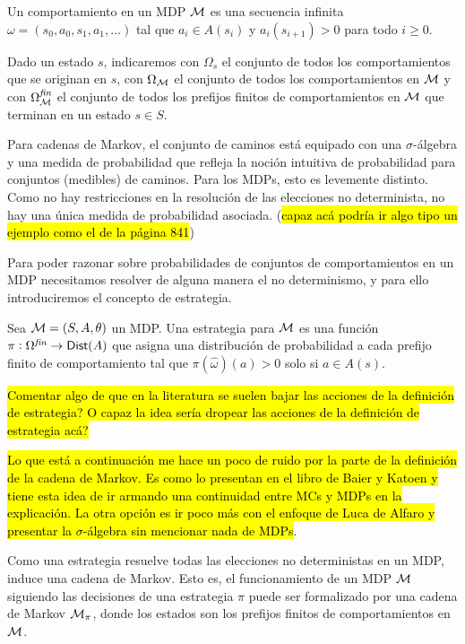 \begin{definition}
	Un comportamiento en un MDP $\mathcal{M}$ es una secuencia infinita $\omega = (s_0, a_0, s_1, a_1, \dots)$ tal que $a_i \in A(s_i)$ y $a_i(s_{i+1}) > 0$ para todo $i \geq 0$.

	Dado un estado $s$, indicaremos con $\Omega_s$ el conjunto de todos los
	comportamientos que se originan en $s$, con $\Omega_{\mathcal{M}}$ el conjunto de todos
	los comportamientos en $\mathcal{M}$ y con $\Omega^{\textit{fin}}_{\mathcal{M}}$ el conjunto de
	todos los prefijos finitos de comportamientos en $\mathcal{M}$ que terminan en un estado
	$s \in S$.
\end{definition}

Para cadenas de Markov, el conjunto de caminos está equipado con una
$\sigma$-álgebra y una medida de probabilidad que refleja la noción intuitiva
de probabilidad para conjuntos (medibles) de caminos. Para los MDPs, esto es
levemente distinto. Como no hay restricciones en la resolución de las
elecciones no determinista, no hay una única medida de probabilidad asociada.
(\hl{capaz acá podría ir algo tipo un ejemplo como el de la página 841})

Para poder razonar sobre probabilidades de conjuntos de comportamientos en un
MDP necesitamos resolver de alguna manera el no determinismo, y para ello
introduciremos el concepto de estrategia.

\begin{definition}
	Sea $\mathcal{M} = (S, A, \theta)$ un MDP. Una estrategia para $\mathcal{M}$ es una función $\pi: \Omega^{\textit{fin}} \rightarrow \mathsf{Dist} (A)$ que asigna una distribución de probabilidad a cada prefijo finito de comportamiento tal que $\pi(\hat \omega) (a) > 0$ solo si $a \in A(s)$.
\end{definition}

\hl{Comentar algo de que en la literatura se suelen bajar las acciones de la definición de estrategia? O capaz la idea sería dropear las acciones de la definición de estrategia acá?}

\hl{Lo que está a continuación me hace un poco de ruido por la parte de la definición de la cadena de Markov. Es como lo presentan en el libro de Baier y Katoen y tiene esta idea de ir armando una continuidad entre MCs y MDPs en la explicación. La otra opción es ir poco más con el enfoque de Luca de Alfaro y presentar la $\sigma$-álgebra sin mencionar nada de MDPs}.

Como una estrategia resuelve todas las elecciones no deterministas en un MDP,
induce una cadena de Markov. Esto es, el funcionamiento de un MDP $\mathcal{M}$
siguiendo las decisiones de una estrategia $\pi$ puede ser formalizado por una
cadena de Markov $\mathcal{M}_\pi$, donde los estados son los prefijos finitos de
comportamientos en $\mathcal{M}$.

